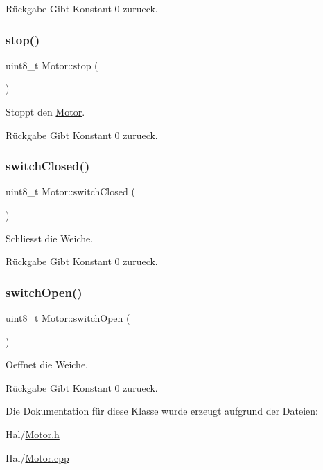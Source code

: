 \begin{DoxyReturn}{Rückgabe}
Gibt Konstant 0 zurueck. 
\end{DoxyReturn}
\hypertarget{class_motor_aab732159d4adf537bbcd3bcf9371d03b}{}\label{class_motor_aab732159d4adf537bbcd3bcf9371d03b} 
\subsubsection{\texorpdfstring{stop()}{stop()}}
{\footnotesize\ttfamily uint8\+\_\+t Motor\+::stop (\begin{DoxyParamCaption}{ }\end{DoxyParamCaption})}

Stoppt den \hyperlink{class_motor}{Motor}.

\begin{DoxyReturn}{Rückgabe}
Gibt Konstant 0 zurueck. 
\end{DoxyReturn}
\hypertarget{class_motor_a38af68cbad8be09b85afc86f156f0f89}{}\label{class_motor_a38af68cbad8be09b85afc86f156f0f89} 
\subsubsection{\texorpdfstring{switch\+Closed()}{switchClosed()}}
{\footnotesize\ttfamily uint8\+\_\+t Motor\+::switch\+Closed (\begin{DoxyParamCaption}{ }\end{DoxyParamCaption})}

Schliesst die Weiche.

\begin{DoxyReturn}{Rückgabe}
Gibt Konstant 0 zurueck. 
\end{DoxyReturn}
\hypertarget{class_motor_a35c0d7c6350b9f670dc243d31ea40263}{}\label{class_motor_a35c0d7c6350b9f670dc243d31ea40263} 
\subsubsection{\texorpdfstring{switch\+Open()}{switchOpen()}}
{\footnotesize\ttfamily uint8\+\_\+t Motor\+::switch\+Open (\begin{DoxyParamCaption}{ }\end{DoxyParamCaption})}

Oeffnet die Weiche.

\begin{DoxyReturn}{Rückgabe}
Gibt Konstant 0 zurueck. 
\end{DoxyReturn}


Die Dokumentation für diese Klasse wurde erzeugt aufgrund der Dateien\+:\begin{DoxyCompactItemize}
\item 
Hal/\hyperlink{_motor_8h}{Motor.\+h}\item 
Hal/\hyperlink{_motor_8cpp}{Motor.\+cpp}\end{DoxyCompactItemize}

